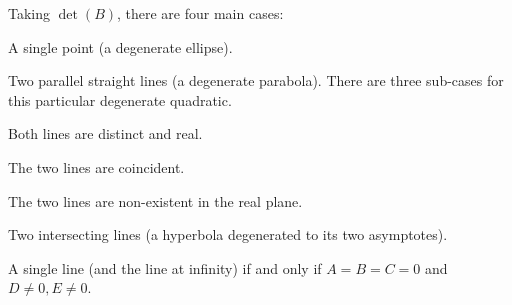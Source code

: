 \begin{blackbox}
  Taking $\det(B)$, there are four main cases:
  \begin{description}[noitemsep]
  \item[$\det(B) > 0$] A single point (a degenerate ellipse).
  \item[$\det(B) = 0$] Two parallel straight lines (a degenerate parabola).
    There are three sub-cases for this particular degenerate quadratic.
    \begin{description}[noitemsep]
    \item[$D^{2} + E^{2} > (A+C) F$] Both lines are distinct and real.
    \item[$D^{2} + E^{2} = (A+C) F$] The two lines are coincident.
    \item[$D^{2} + E^{2} < (A+C) F$] The two lines are non-existent in the real plane.
    \end{description}
  \item[$\det(B) < 0$] Two intersecting lines (a hyperbola degenerated to its two asymptotes).
  \item[$\det(B) \neq 0$] A single line (and the line at infinity) if and only if $A = B = C = 0$ and $D \neq 0, E \neq 0$.
  \end{description}
\end{blackbox}

